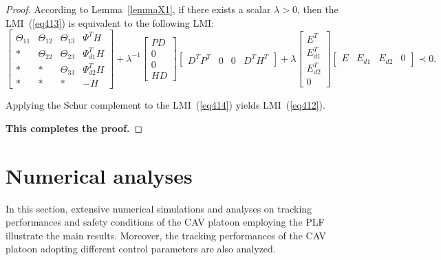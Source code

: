 \documentclass[a4paper]{cas-sc}
\newtheorem*{proof}{Proof}
\begin{document}
\begin{proof}
  According to Lemma~\ref{lemmaX1}, if there exists a scalar $\lambda>0$, then the LMI~(\ref{eq413}) is equivalent to the following LMI:
  \begin{equation}
    \left[ {\begin{array}{*{20}{c}}
            {{\Theta _{11}}} & {{\Theta _{12}}} & {{\Theta _{13}}} & {{\Psi ^T}H}    \\
            *                & {{\Theta _{22}}} & {{\Theta _{23}}} & {\Psi _{d1}^TH} \\
            *                & *                & {{\Theta _{33}}} & {\Psi _{d2}^TH} \\
            *                & *                & *                & { - H}
          \end{array}} \right] + {\lambda ^{ - 1}}\left[ {\begin{array}{*{20}{c}}
            {PD} \\
            0    \\
            0    \\
            {HD}
          \end{array}} \right]\left[ {\begin{array}{*{20}{c}}
            {{D^T}{P^T}} & 0 & 0 & {{D^T}{H^T}}
          \end{array}} \right] + \lambda \left[ {\begin{array}{*{20}{c}}
            {{E^T}}    \\
            {E_{d1}^T} \\
            {E_{d2}^T} \\
            0
          \end{array}} \right]\left[ {\begin{array}{*{20}{c}}
            E & {{E_{d1}}} & {{E_{d2}}} & 0
          \end{array}} \right] \prec 0.
    \label{eq414}
  \end{equation}

  Applying the Schur complement to the LMI~(\ref{eq414}) yields LMI~(\ref{eq412}).

  \textbf{This completes the proof.}

\end{proof}

\section{Numerical analyses}
\label{Section 5}
In this section, extensive numerical simulations and analyses on tracking performances and safety conditions of the CAV platoon employing the PLF illustrate the main results. Moreover, the tracking performances of the CAV platoon adopting different control parameters are also analyzed.
\end{document}
